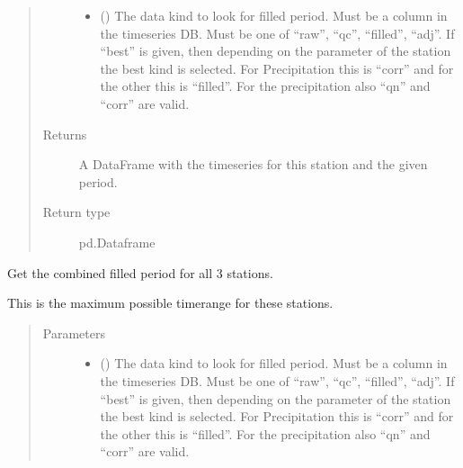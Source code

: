 \documentclass[letterpaper,10pt,english]{sphinxmanual}
\begin{document}
\begin{fulllineitems}
\begin{fulllineitems}
\begin{quote}
\begin{description}
\begin{itemize}
\item {} 
\sphinxAtStartPar
{} () \textendash{} The data kind to look for filled period.
Must be a column in the timeseries DB.
Must be one of “raw”, “qc”, “filled”, “adj”.
If “best” is given, then depending on the parameter of the station the best kind is selected.
For Precipitation this is “corr” and for the other this is “filled”.
For the precipitation also “qn” and “corr” are valid.

\end{itemize}

\item[{Returns}] \leavevmode
\sphinxAtStartPar
A DataFrame with the timeseries for this station and the given period.

\item[{Return type}] \leavevmode
\sphinxAtStartPar
pd.Dataframe

\end{description}\end{quote}

\end{fulllineitems}


\begin{fulllineitems}
\label{\detokenize{weatherDB:weatherDB.station.GroupStation.get_filled_period}}
\sphinxAtStartPar
Get the combined filled period for all 3 stations.

\sphinxAtStartPar
This is the maximum possible timerange for these stations.
\begin{quote}\begin{description}
\item[{Parameters}] \leavevmode\begin{itemize}
\item {} 
\sphinxAtStartPar
{} () \textendash{} The data kind to look for filled period.
Must be a column in the timeseries DB.
Must be one of “raw”, “qc”, “filled”, “adj”.
If “best” is given, then depending on the parameter of the station the best kind is selected.
For Precipitation this is “corr” and for the other this is “filled”.
For the precipitation also “qn” and “corr” are valid.


\end{itemize}
\end{description}
\end{quote}
\end{fulllineitems}
\end{fulllineitems}
\end{document}
